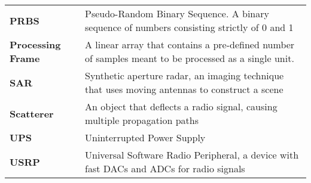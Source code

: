 \begin{longtable}{>{\raggedleft\arraybackslash}p{3.5cm}p{11cm}}
\bfseries{PRBS} & Pseudo-Random Binary Sequence. A binary sequence of numbers consisting strictly of 0 and 1\\
\bfseries{Processing Frame} & A linear array that contains a pre-defined number of samples meant to be processed as a single unit.\\
\bfseries{SAR} & Synthetic aperture radar, an imaging technique that uses moving antennas to construct a scene\\
\bfseries{Scatterer} & An object that deflects a radio signal, causing multiple propagation paths\\
\bfseries{UPS} & Uninterrupted Power Supply\\
\bfseries{USRP} & Universal Software Radio Peripheral, a device with fast DACs and ADCs for radio signals\\
\end{longtable}